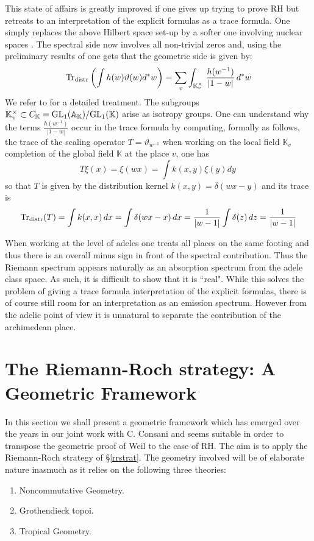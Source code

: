 \documentclass[12pt]{article}
\def\GL{{\rm GL}}
\def\Tr{{\rm Tr}}
\def\A{{\mathbb A}}
\def\K{{\mathbb K}}
\def\urep{\vartheta}
\def\Tr{{\rm Tr}}
\begin{document}
This state of affairs is greatly improved if one gives up trying to prove RH but retreats to an interpretation of the explicit formulas as a trace formula. One simply replaces the above Hilbert space set-up by a softer one involving nuclear spaces \cite{Meyer}. The spectral side now involves all non-trivial zeros and, using the preliminary results of \cite{Co-zeta,Co99,burnol} one gets that the geometric side is given by:
\begin{equation}\label{geomside}
\Tr_{\rm distr}\left(\int h(w)\urep(w)d^*w\right )=\sum_v\int_{\K^\times_v}\,\frac{h(w^{-1})}{|1-w|}\,d^*w
\end{equation}
We refer to \cite{Co-zeta, Meyer, CMbook} for a detailed treatment.
The subgroups $\K^\times_v\subset C_\K=\GL_1(\A_\K)/\GL_1(\K)$ arise as isotropy groups.
One can understand why the terms $\displaystyle \frac{h(w^{-1})}{|1-w|}$ occur in the trace formula by computing, formally as follows, the trace  of the scaling operator $T=\urep_{w^{-1}}$ when working on the local field $\K_v$ completion of the global field $\K$ at the place $v$, one has
$$T\xi(x)=\xi(w x)=\int k(x,y)\xi(y)dy\,
 $$
so that $T$ is given by the distribution kernel $k(x,y)=\delta(w x-y)$ and its trace is 
 $$
\Tr_{\rm distr}(T)=\int k(x,x)\,dx=\int \delta(w x-x)\,dx=\frac{1}{|w-1|}\int \delta(z)\,dz=\frac{1}{|w-1|}
$$


When working at the level of adeles one treats all places on the same footing and thus there is an overall minus sign in front of the spectral contribution. 
Thus the Riemann spectrum appears naturally as an absorption spectrum from the adele class space. As such, it is difficult to show that it is ``real". While this solves the problem of giving a trace formula interpretation of the explicit formulas, there is of course still room for an interpretation as an emission spectrum. However from the adelic point of view it is unnatural to separate the contribution of the archimedean place.

\section{The Riemann-Roch strategy: A Geometric Framework}
\label{algeomattack}
In this section we shall present a geometric framework which has emerged over the years in our joint work with C. Consani and seems suitable in order to transpose the geometric proof of Weil to the case of RH. The aim is to apply the Riemann-Roch strategy of \S \ref{rrstrat}. The geometry involved will be of elaborate  nature inasmuch as it relies on the following three theories:
\begin{enumerate}
\item{Noncommutative Geometry.}
\item{Grothendieck topoi.}
\item{Tropical Geometry.}
\end{enumerate}
\end{document}
